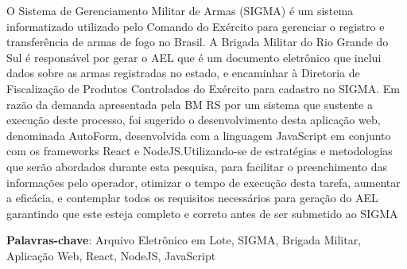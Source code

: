\setlength{\absparsep}{18pt} %
\begin{resumo}
	O Sistema de Gerenciamento Militar de Armas (SIGMA) é um sistema informatizado utilizado
	pelo Comando do Exército para gerenciar o registro e transferência de armas de fogo no
	Brasil. A Brigada Militar do Rio Grande do Sul é responsável por gerar o AEL que é um documento eletrônico que inclui dados sobre as armas registradas no estado, e encaminhar à Diretoria de Fiscalização de Produtos Controlados do Exército para cadastro no SIGMA. Em razão da demanda apresentada
	pela BM RS por um sistema que sustente a execução deste processo, foi sugerido o desenvolvimento desta aplicação web, denominada AutoForm, desenvolvida com a linguagem JavaScript
	em conjunto com os frameworks React e NodeJS.Utilizando-se de estratégias e metodologias
	que serão abordados durante esta pesquisa, para facilitar o preenchimento das informações pelo
	operador, otimizar o tempo de execução desta tarefa, aumentar a eficácia, e contemplar todos os
	requisitos necessários para geração do AEL garantindo que este esteja completo e correto antes
	de ser submetido ao SIGMA

	
	\textbf{Palavras-chave}: Arquivo Eletrônico em Lote, SIGMA, Brigada Militar, Aplicação Web, React, NodeJS,  JavaScript  %
\end{resumo}